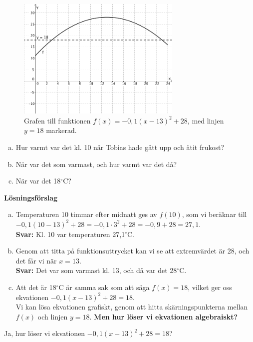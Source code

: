 \begin{figure}
  \centering
  \includegraphics[width=0.7\textwidth]{bilder/temperatur.png}
  \caption{\label{fig:temperatur}Grafen till funktionen $f(x) = -0,1(x-13)^2+28$, med linjen $y=18$ markerad.}
\end{figure}

\begin{enumerate}[(a)]
  \item Hur varmt var det kl. 10 när Tobias hade gått upp och ätit frukost?
  \item När var det som varmast, och hur varmt var det då?
  \item När var det 18$^{\circ}$C?
\end{enumerate}

\textbf{Lösningsförslag}
\begin{enumerate}[(a)]
  \item Temperaturen 10 timmar efter midnatt ges av $f(10)$, som vi beräknar till $-0,1(10-13)^2+28 = -0,1 \cdot 3^2 + 28 = -0,9+28 = 27,1$. \\
  \textbf{Svar:} Kl. 10 var temperaturen 27,1$^{\circ}$C.
  \item Genom att titta på funktionsuttrycket kan vi se att extremvärdet är 28, och det får vi när $x=13$. \\
  \textbf{Svar:} Det var som varmast kl. 13, och då var det 28$^{\circ}$C.
  \item Att det är 18$^{\circ}$C är samma sak som att säga $f(x)=18$, vilket ger oss ekvationen $-0,1(x-13)^2+28=18$. \\
  Vi kan lösa ekvationen grafiskt, genom att hitta skärningspunkterna mellan $f(x)$ och linjen $y=18$.
  \textbf{Men hur löser vi ekvationen algebraiskt?}
\end{enumerate}

Ja, hur löser vi ekvationen $-0,1(x-13)^2+28=18$?

